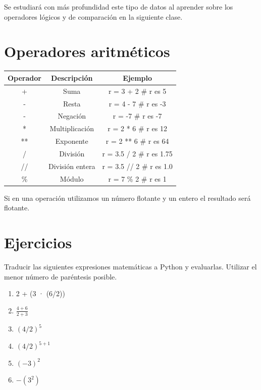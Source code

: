 Se estudiará con más profundidad este tipo de datos al aprender sobre los operadores lógicos y de comparación en la siguiente clase.

\section{Operadores aritméticos}

\begin{table}[h]
\centering
\begin{tabular}{|c|c|c|} \hline
Operador	             & Descripción & Ejemplo     \\ \hline
+         & Suma               & r = 3 + 2    \# r es 5   \\ \hline
-         & Resta              & r = 4 - 7    \# r es -3   \\ \hline
-         & Negación           & r = -7       \# r es -7   \\ \hline     
*         & Multiplicación     & r = 2 * 6    \# r es 12   \\ \hline
**        & Exponente          & r = 2 ** 6   \# r es 64    \\ \hline
/         & División           & r = 3.5 / 2  \# r es 1.75    \\ \hline
//        & División entera    & r = 3.5 // 2 \# r es 1.0    \\ \hline
\%         & Módulo             & r = 7 \% 2    \# r es 1   \\ \hline
\end{tabular}
\end{table}

Si en una operación utilizamos un número flotante y un entero el resultado será flotante.\\

\section{Ejercicios}

Traducir las siguientes expresiones matemáticas a Python y evaluarlas. Utilizar el menor número de paréntesis posible.

\begin{enumerate}
\item 2 + (3 · (6/2))
\item $\frac{4 + 6}{2 + 3}$
\item $(4/2)^5$
\item $(4/2)^{5+1}$
\item $(−3)^2$
\item $−(3^2)$
\end{enumerate}

